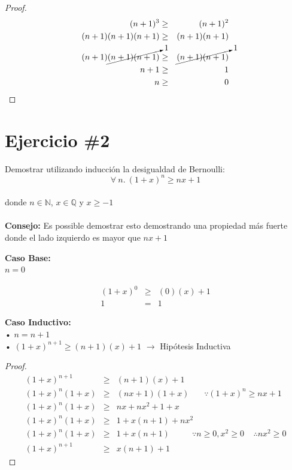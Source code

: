 \documentclass[11pt,letterpaper]{article}
\begin{document}
\begin{proof}

\begin{eqnarray*}
(n+1)^3&\geq&(n+1)^2\\
(n+1)(n+1)(n+1)&\geq&(n+1)(n+1)\\
(n+1)\cancelto{1}{(n+1)(n+1)}&\geq&\cancelto{1}{(n+1)(n+1)} \\
n+1&\geq& 1\\
n&\geq& 0
\end{eqnarray*}

\end{proof}


\section*{\Large Ejercicio \#2}
\noindent Demostrar utilizando inducción la desigualdad de Bernoulli:
\[
        \forall\ n.\ (1+x)^n\geq nx+1
\]
\\donde $n\in \mathbb{N}$, $x\in \mathbb{Q}$ y $x\geq -1$
\\
\\{\bf Consejo: }Es possible demostrar esto demostrando una propiedad más fuerte
donde el lado izquierdo es mayor que $nx + 1$ \vspace{1cm}

\noindent \textbf{\large Caso Base:}\\
\noindent $n=0$

\begin{eqnarray*}
(1+x)^0 &\geq& (0)(x)+1 \\
1 &=& 1
\end{eqnarray*}

\vspace{0.1cm}

\noindent \textbf{\large Caso Inductivo:}\\
\noindent • $n=n+1$ \\
\noindent • $(1+x)^{n+1}\geq (n+1)(x)+1$ $\rightarrow$ Hipótesis Inductiva \\

\begin{proof}

\begin{eqnarray*}
(1+x)^{n+1}&\geq&(n+1)(x)+1 \\
(1+x)^n(1+x)&\geq&(nx+1)(1+x) \ \ \ \ \ \ \ \ \because(1+x)^n \geq nx+1 \\ 
(1+x)^n(1+x)&\geq& nx+nx^2+1+x \\
(1+x)^n(1+x)&\geq& 1+x(n+1)+nx^2 \\
(1+x)^n(1+x)&\geq& 1+x(n+1) \ \ \ \ \ \ \ \ \ \ \ \ \because n \geq 0, x^2 \geq 0 \ \ \ \ \ \therefore nx^2 \geq 0 \\
(1+x)^{n+1}&\geq& x(n+1)+1
\end{eqnarray*}

\end{proof}
\end{document}
